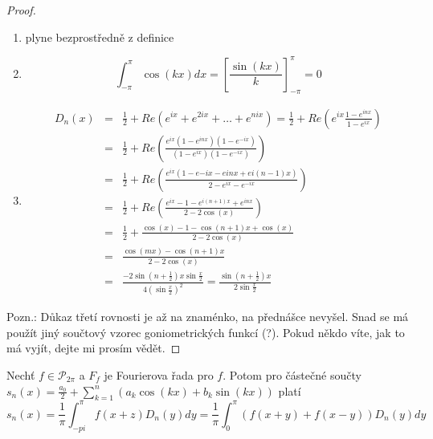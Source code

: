 \begin{proof}
\begin{enumerate}
\item plyne bezprostředně z definice
\item $$\int_{-\pi}^\pi \cos(kx) dx = \left[ \frac{\sin(kx)}{k} \right]_{-\pi}^\pi = 0$$
\item
\begin{eqnarray}
D_n(x) & = & \frac{1}{2} + Re \left( e^{ix} + e^{2ix} + \ldots + e^{nix} \right) = \frac{1}{2} + Re \left( e^{ix} \frac{1-e^{inx}}{1-e^{ix}} \right) \nonumber\\
& = & \frac{1}{2} + Re \left( \frac{e^{ix} \left( 1-e^{inx} \right) \left( 1-e^{-ix} \right)}{\left( 1-e^{ix} \right) \left( 1-e^{-ix} \right)} \right) \nonumber\\
& = & \frac{1}{2} + Re \left( \frac{e^{ix} \left( 1-e{-ix}-e{inx}+e{i(n-1)x} \right)}{2-e^{ix}-e^{-ix}} \right) \nonumber\\
& = & \frac{1}{2} + Re \left( \frac{e^{ix} - 1 - e^{i(n+1)x} + e^{inx}}{2 - 2 \cos(x)} \right) \nonumber\\
& = & \frac{1}{2} + \frac{\cos(x)-1-\cos(n+1)x + \cos(x)}{2-2\cos(x)} \nonumber\\
& = & \frac{\cos(mx) - \cos(n+1)x}{2 - 2\cos(x)} \nonumber\\
& = & \frac{-2 \sin \left( n + \frac{1}{2} \right) x \sin \frac{x}{2}}{4 \left( \sin \frac{x}{2} \right)^{2}} = \frac{\sin \left(n + \frac{1}{2} \right) x}{2 \sin \frac{x}{2}} \nonumber
\end{eqnarray}
\end{enumerate}

Pozn.: Důkaz třetí rovnosti je až na znaménko, na přednášce nevyšel. Snad se má použít jiný součtový vzorec goniometrických funkcí (?). Pokud někdo víte, jak to má vyjít, dejte mi prosím vědět.
\end{proof}

\begin{vetal}
Nechť $f \in \mathcal{P}_{2 \pi}$ a $F_f$ je Fourierova řada pro $f$. Potom pro částečné součty $s_n(x) = \frac{a_0}{2} + \sum_{k=1}^{n} (a_k \cos ( kx) + b_k \sin ( kx ))$ platí
$$s_n(x) = \frac{1}{\pi} \int_{-pi}^\pi f(x+z)D_n(y)dy = \frac{1}{\pi} \int_0^\pi \left( f(x+y) + f(x-y) \right) D_n(y) dy$$
\end{vetal}

